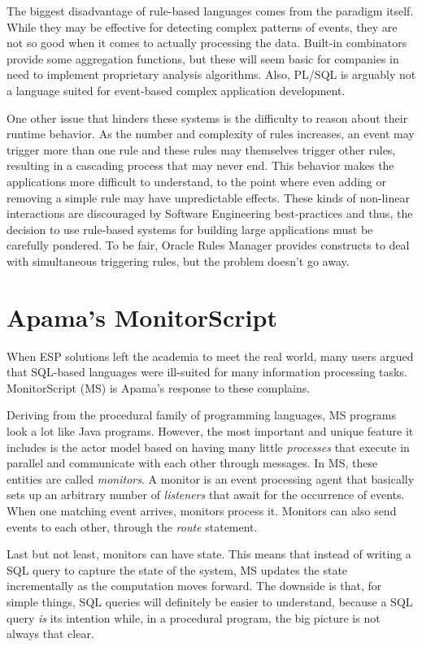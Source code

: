 The biggest disadvantage of rule-based languages comes from the
paradigm itself. While they may be effective for detecting complex
patterns of events, they are not so good when it comes to actually
processing the data. Built-in combinators provide some aggregation
functions, but these will seem basic for companies in need to
implement proprietary analysis algorithms. Also, PL/SQL is arguably
not a language suited for event-based complex application development.

One other issue that hinders these systems is the difficulty to reason
about their runtime behavior. As the number and complexity of rules
increases, an event may trigger more than one rule and these rules may
themselves trigger other rules, resulting in a cascading process that
may never end. This behavior makes the applications more difficult to
understand, to the point where even adding or removing a simple rule
may have unpredictable effects. These kinds of non-linear interactions
are discouraged by Software Engineering best-practices and thus, the
decision to use rule-based systems for building large applications
must be carefully pondered. To be fair, Oracle Rules Manager provides
constructs to deal with simultaneous triggering rules, but the problem
doesn't go away.

\section{Apama's MonitorScript}

When ESP solutions left the academia to meet the real world, many
users argued that SQL-based languages were ill-suited for many
information processing tasks. MonitorScript (MS) is Apama's response
to these complains.

Deriving from the procedural family of programming languages, MS
programs look a lot like Java programs. However, the most important
and unique feature it includes is the actor model based on having many
little \emph{processes} that execute in parallel and communicate with
each other through messages. In MS, these entities are called
\emph{monitors}. A monitor is an event processing agent that basically
sets up an arbitrary number of \emph{listeners} that await for the
occurrence of events. When one matching event arrives, monitors
process it. Monitors can also send events to each other, through the
\emph{route} statement.

Last but not least, monitors can have state. This means that instead
of writing a SQL query to capture the state of the system, MS updates
the state incrementally as the computation moves forward. The downside
is that, for simple things, SQL queries will definitely be easier to
understand, because a SQL query \emph{is} its intention while, in a
procedural program, the big picture is not always that clear.

